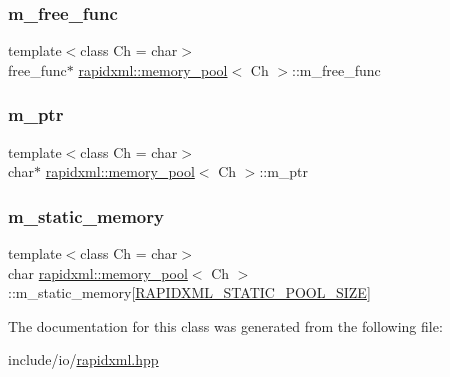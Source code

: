\subsubsection{\texorpdfstring{m\_free\_func}{m\_free\_func}}
{\footnotesize\ttfamily template$<$class Ch  = char$>$ \\
free\+\_\+func$\ast$ \mbox{\hyperlink{classrapidxml_1_1memory__pool}{rapidxml\+::memory\+\_\+pool}}$<$ Ch $>$\+::m\+\_\+free\+\_\+func\hspace{0.3cm}{\ttfamily [private]}}

\mbox{\label{classrapidxml_1_1memory__pool_a4a89ff677c72afc163d1855cefc28013}} 
\subsubsection{\texorpdfstring{m\_ptr}{m\_ptr}}
{\footnotesize\ttfamily template$<$class Ch  = char$>$ \\
char$\ast$ \mbox{\hyperlink{classrapidxml_1_1memory__pool}{rapidxml\+::memory\+\_\+pool}}$<$ Ch $>$\+::m\+\_\+ptr\hspace{0.3cm}{\ttfamily [private]}}

\mbox{\label{classrapidxml_1_1memory__pool_aacc5ca734ebfbef7f42251764eb396f4}} 
\subsubsection{\texorpdfstring{m\_static\_memory}{m\_static\_memory}}
{\footnotesize\ttfamily template$<$class Ch  = char$>$ \\
char \mbox{\hyperlink{classrapidxml_1_1memory__pool}{rapidxml\+::memory\+\_\+pool}}$<$ Ch $>$\+::m\+\_\+static\+\_\+memory\mbox{[}\mbox{\hyperlink{rapidxml_8hpp_a001304844ab478e3b213749fc8d72ca2}{R\+A\+P\+I\+D\+X\+M\+L\+\_\+\+S\+T\+A\+T\+I\+C\+\_\+\+P\+O\+O\+L\+\_\+\+S\+I\+ZE}}\mbox{]}\hspace{0.3cm}{\ttfamily [private]}}



The documentation for this class was generated from the following file\+:\begin{DoxyCompactItemize}
\item 
include/io/\mbox{\hyperlink{rapidxml_8hpp}{rapidxml.\+hpp}}\end{DoxyCompactItemize}
